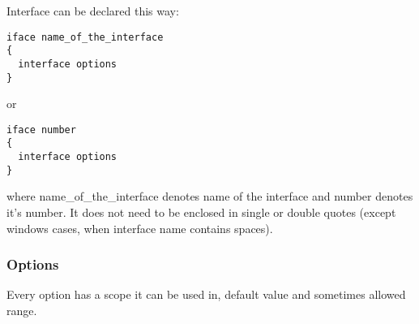 Interface can be declared this way:
\begin{verbatim}
iface name_of_the_interface
{
  interface options
}
\end{verbatim}

or 

\begin{verbatim}
iface number 
{
  interface options
}
\end{verbatim}

where name\_of\_the\_interface denotes name of the interface and
number denotes it's number. It does not need to be enclosed in
single or double quotes (except windows cases, when interface name
contains spaces).

\subsubsection{Options}

Every option has a scope it can be used in, default value and
sometimes allowed range.

